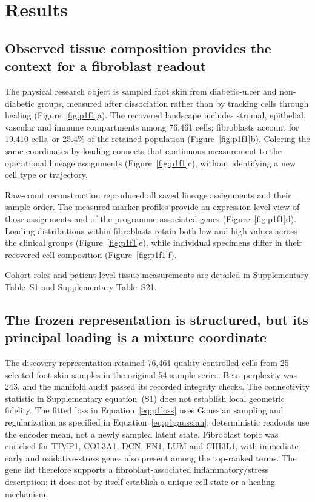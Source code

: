 \documentclass[10pt,a4paper]{article}
\begin{document}
\section{Results}
\subsection{Observed tissue composition provides the context for a fibroblast readout}



The physical research object is sampled foot skin from diabetic-ulcer and non-diabetic groups, measured after dissociation rather than by tracking cells through healing (Figure~\ref{fig:p1f1}a\label{call:p1f1}). The recovered landscape includes stromal, epithelial, vascular and immune compartments among 76,461 cells; fibroblasts account for 19,410 cells, or 25.4\% of the retained population (Figure~\ref{fig:p1f1}b). Coloring the same coordinates by loading connects that continuous measurement to the operational lineage assignments (Figure~\ref{fig:p1f1}c), without identifying a new cell type or trajectory.

Raw-count reconstruction reproduced all saved lineage assignments and their sample order. The measured marker profiles provide an expression-level view of those assignments and of the programme-associated genes (Figure~\ref{fig:p1f1}d). Loading distributions within fibroblasts retain both low and high values across the clinical groups (Figure~\ref{fig:p1f1}e), while individual specimens differ in their recovered cell composition (Figure~\ref{fig:p1f1}f).

Cohort roles and patient-level tissue measurements are detailed in Supplementary Table~S1 and Supplementary Table~S21.

\subsection{The frozen representation is structured, but its principal loading is a mixture coordinate}
The discovery representation retained 76,461 quality-controlled cells from 25 selected foot-skin samples in the original 54-sample series. Beta perplexity was 243, and the manifold audit passed its recorded integrity checks. The connectivity statistic in Supplementary equation~(S1) does not establish local geometric fidelity. The fitted loss in Equation~\eqref{eq:p1loss} uses Gaussian sampling and regularization as specified in Equation~\eqref{eq:p1gaussian}; deterministic readouts use the encoder mean, not a newly sampled latent state. Fibroblast topic was enriched for TIMP1, COL3A1, DCN, FN1, LUM and CHI3L1, with immediate-early and oxidative-stress genes also present among the top-ranked terms. The gene list therefore supports a fibroblast-associated inflammatory/stress description; it does not by itself establish a unique cell state or a healing mechanism.
\end{document}
